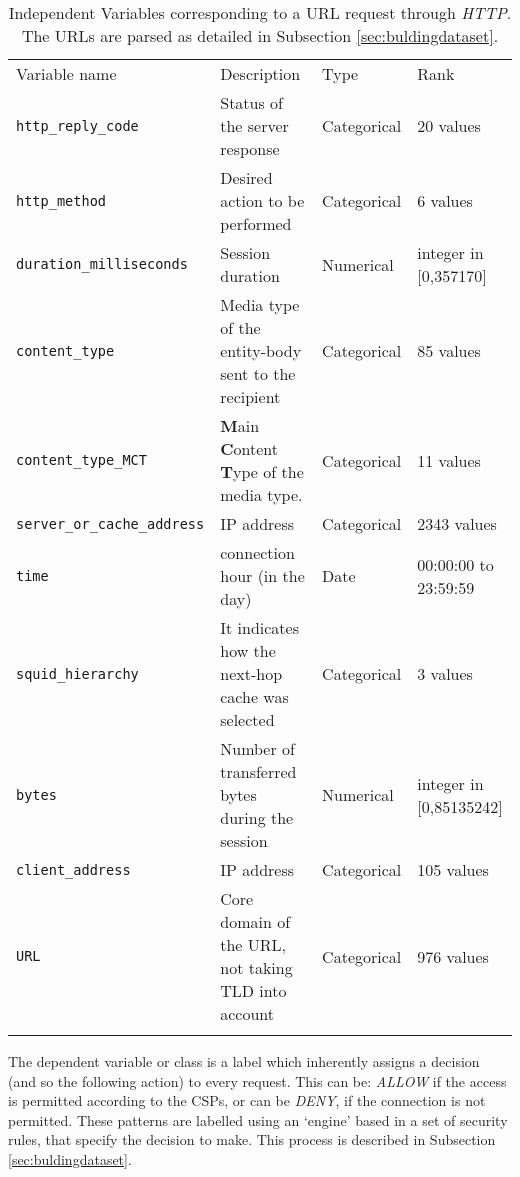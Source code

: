 \documentclass{llncs}
\begin{document}
\begin{table*}[htpb]
\centering
 \caption{\label{tabdata} Independent Variables corresponding to a URL
   request through \textit{HTTP}. The URLs are parsed as detailed in
   Subsection \ref{sec:buldingdataset}.}

{\scriptsize
\begin{tabular}{llll}
\hline\noalign{\smallskip}
Variable name & Description & Type & Rank\\
\noalign{\smallskip}\hline\noalign{\smallskip}
\texttt{http\_reply\_code} & Status of the server response & Categorical & 20 values\\
\texttt{http\_method} & Desired action to be performed & Categorical & 6 values\\
\texttt{duration\_milliseconds} & Session duration & Numerical & integer in [0,357170]\\
\texttt{content\_type} & Media type of the entity-body sent to the recipient & Categorical & 85 values\\
\texttt{content\_type\_MCT} & \textbf{M}ain \textbf{C}ontent \textbf{T}ype of the media type. & Categorical & 11 values\\
\texttt{server\_or\_cache\_address} & IP address & Categorical & 2343 values\\
\texttt{time} & connection hour (in the day) & Date & 00:00:00 to 23:59:59\\
\texttt{squid\_hierarchy} & It indicates how the next-hop cache was selected & Categorical & 3 values\\
\texttt{bytes} & Number of transferred bytes during the session & Numerical & integer in [0,85135242]\\
\texttt{client\_address} & IP address & Categorical & 105 values\\
\texttt{URL} & Core domain of the URL, not taking TLD into account & Categorical & 976 values\\
\noalign{\smallskip}\hline
\end{tabular}
}
\end{table*}

The dependent variable or class is a label which inherently assigns a decision (and so the following action) to every request. This can be: \textit{ALLOW} if the access is permitted according to the CSPs, or can be \textit{DENY}, if the connection is not permitted. These patterns are labelled using an `engine' based in a set of security rules, that specify the decision to make. This process is described in Subsection \ref{sec:buldingdataset}.
\end{document}
